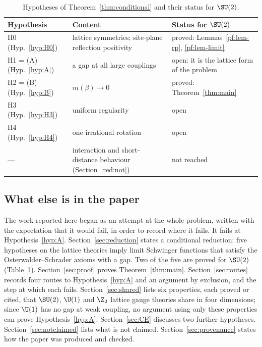 \begin{table}[ht]
\centering
\small
\begin{tabular}{@{}p{}p{}p{}@{}}
\toprule
Hypothesis & Content & Status for $\SU(2)$ \\
\midrule
H0 (Hyp.~\ref{hyp:H0}) & lattice symmetries; site-plane reflection positivity & proved: Lemmas~\ref{pf:lem-rp}, \ref{pf:lem-limit} \\
H1 = (A) (Hyp.~\ref{hyp:A}) & a gap at all large couplings & open: it is the lattice form of the problem \\
H2 = (B) (Hyp.~\ref{hyp:B}) & $m(\beta)\to0$ & proved: Theorem~\ref{thm:main} \\
H3 (Hyp.~\ref{hyp:H3}) & uniform regularity & open \\
H4 (Hyp.~\ref{hyp:H4}) & one irrational rotation & open \\
--- & interaction and short-distance behaviour (Section~\ref{red:not}) & not reached \\
\bottomrule
\end{tabular}
\caption{Hypotheses of Theorem~\ref{thm:conditional} and their status for $\SU(2)$.}\label{intro:status}
\end{table}

\subsection*{What else is in the paper}
The work reported here began as an attempt at the whole problem, written with the expectation that it would fail, in order to record where it fails. It fails at Hypothesis~\ref{hyp:A}. Section~\ref{sec:reduction} states a conditional reduction: five hypotheses on the lattice theories imply limit Schwinger functions that satisfy the Osterwalder--Schrader axioms with a gap. Two of the five are proved for $\SU(2)$ (Table~\ref{intro:status}). Section~\ref{sec:proof} proves Theorem~\ref{thm:main}. Section~\ref{sec:routes} records four routes to Hypothesis~\ref{hyp:A} and an argument by exclusion, and the step at which each fails. Section~\ref{sec:shared} lists six properties, each proved or cited, that $\SU(2)$, $\U(1)$ and $\Z_2$ lattice gauge theories share in four dimensions; since $\U(1)$ has no gap at weak coupling, no argument using only these properties can prove Hypothesis~\ref{hyp:A}. Section~\ref{sec:CE} discusses two further hypotheses. Section~\ref{sec:notclaimed} lists what is not claimed. Section~\ref{sec:provenance} states how the paper was produced and checked.

